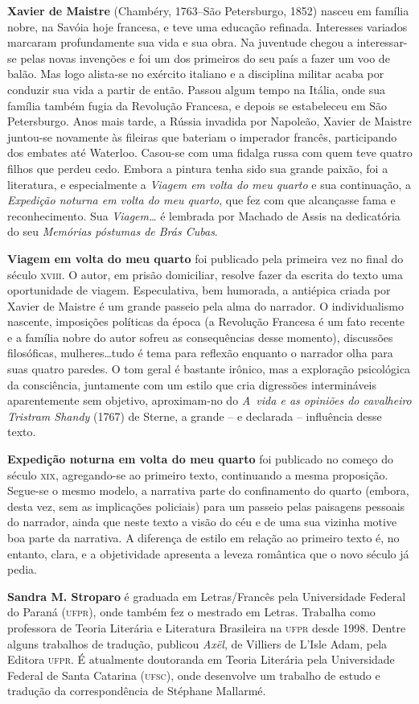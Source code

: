 \textbf{Xavier de Maistre} (Chambéry, 1763--São Petersburgo, 1852)
nasceu em família nobre, na Savóia hoje francesa, e teve uma educação
refinada. Interesses variados marcaram profundamente sua vida e
sua obra. Na juventude chegou a interessar-se pelas novas invenções e
foi um dos primeiros do seu país a fazer um voo de balão. Mas logo
alista-se no exército italiano e a disciplina militar acaba por
conduzir sua vida a partir de então. Passou algum tempo na Itália, onde
sua família também fugia da Revolução Francesa, e depois se estabeleceu
em São Petersburgo. Anos mais tarde, a Rússia invadida por Napoleão,
Xavier de Maistre juntou-se novamente às fileiras que bateriam o
imperador francês, participando dos embates até Waterloo. Casou-se com
uma fidalga russa com quem teve quatro filhos que perdeu cedo. Embora a
pintura tenha sido sua grande paixão, foi a literatura, e especialmente
a \textit{Viagem em volta do meu quarto} e sua continuação, a
\textit{Expedição noturna em volta do meu quarto}, que fez com que
alcançasse fama e reconhecimento. Sua \textit{Viagem\ldots} é lembrada por
Machado de Assis na dedicatória do seu \textit{Memórias póstumas de Brás Cubas}.   

\textbf{Viagem em volta do meu quarto} foi publicado pela primeira vez
no final do século \textsc{xviii}. O autor, em prisão domiciliar, resolve fazer
da escrita do texto uma oportunidade de viagem. Especulativa, bem
humorada, a antiépica criada por Xavier de Maistre é um grande passeio
pela alma do narrador. O individualismo nascente, imposições políticas
da época (a Revolução Francesa é um fato recente e a família nobre do
autor sofreu as consequências desse momento), discussões filosóficas,
mulheres\ldots tudo é tema para reflexão enquanto o narrador olha para
suas quatro paredes. O tom geral é bastante irônico, mas a exploração
psicológica da consciência, juntamente com um estilo que cria
digressões intermináveis aparentemente sem objetivo, aproximam-no do
\textit{\mbox{A vida} e as opiniões do cavalheiro Tristram Shandy} (1767) de
Sterne, a grande -- e declarada -- influência desse texto.  

\textbf{Expedição noturna em volta do meu quarto} foi publicado no
começo do século \textsc{xix}, agregando-se ao primeiro texto, continuando a
mesma proposição. Segue-se o mesmo modelo, a narrativa parte do
confinamento do quarto (embora, desta vez, sem as implicações
policiais) para um passeio pelas paisagens pessoais do narrador, ainda
que neste texto a visão do céu e de uma sua vizinha motive boa parte
da narrativa. A diferença de estilo em relação ao primeiro texto é, no
entanto, clara, e a objetividade apresenta a leveza romântica que o
novo século já pedia. 

\textbf{Sandra M. Stroparo} é graduada em Letras/Francês pela Universidade
Federal do Paraná (\textsc{ufpr}), onde também fez o mestrado em Letras.
Trabalha como professora de Teoria Literária e Literatura Brasileira na
\textsc{ufpr} desde 1998. Dentre alguns trabalhos de tradução, publicou
\textit{Axël}, de Villiers de L’Isle Adam, pela Editora \textsc{ufpr}. É
atualmente doutoranda em Teoria Literária pela Universidade Federal de
Santa Catarina (\textsc{ufsc}), onde desenvolve um trabalho de estudo e tradução
da correspondência de Stéphane Mallarmé. 


